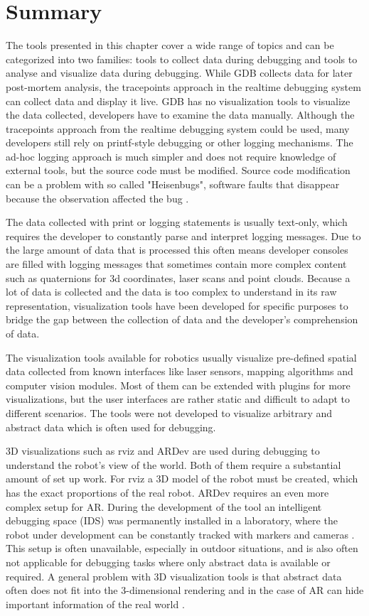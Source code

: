 \section{Summary}

The tools presented in this chapter cover a wide range of topics and can be categorized into two families: tools to collect data during debugging and tools to analyse and visualize data during debugging. While GDB collects data for later post-mortem analysis, the tracepoints approach in the realtime debugging system can collect data and display it live. GDB has no visualization tools to visualize the data collected, developers have to examine the data manually. Although the tracepoints approach from the realtime debugging system \cite{Gumbley2009} could be used, many developers still rely on printf-style debugging or other logging mechanisms. The ad-hoc logging approach is much simpler and does not require knowledge of external tools, but the source code must be modified. Source code modification can be a problem with so called "Heisenbugs", software faults that disappear because the observation affected the bug \cite{Grottke2005}.

The data collected with print or logging statements is usually text-only, which requires the developer to constantly parse and interpret logging messages. Due to the large amount of data that is processed this often means developer consoles are filled with logging messages that sometimes contain more complex content such as quaternions for 3d coordinates, laser scans and point clouds. Because a lot of data is collected and the data is too complex to understand in its raw representation, visualization tools have been developed for specific purposes to bridge the gap between the collection of data and the developer's comprehension of data.

The visualization tools available for robotics usually visualize pre-defined spatial data collected from known interfaces like laser sensors, mapping algorithms and computer vision modules. Most of them can be extended with plugins for more visualizations, but the user interfaces are rather static and difficult to adapt to different scenarios. The tools were not developed to visualize arbitrary and abstract data which is often used for debugging.

3D visualizations such as rviz and ARDev are used during debugging to understand the robot's view of the world. Both of them require a substantial amount of set up work. For rviz a 3D model of the robot must be created, which has the exact proportions of the real robot. ARDev requires an even more complex setup for AR. During the development of the tool an intelligent debugging space (IDS) was permanently installed in a laboratory, where the robot under development can be constantly tracked with markers and cameras \cite{Collett2010}. This setup is often unavailable, especially in outdoor situations, and is also often not applicable for debugging tasks where only abstract data is available or required. A general problem with 3D visualization tools is that abstract data often does not fit into the 3-dimensional rendering and in the case of AR can hide important information of the real world \cite{Collett2010}.
